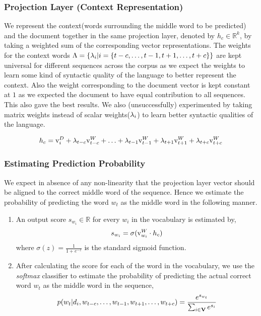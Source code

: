 \subsubsection{Projection Layer (Context Representation)}
We represent the context(words surrounding the middle word to be predicted) and the document together in the same projection layer, denoted by $h_{c} \in \mathbb{R}^{k}$, by taking a weighted sum of the corresponding vector representations. 
The weights for the context words $\Lambda = \{\lambda_{i} | i=\{t-c, \ldots, t-1, t+1, \ldots, t+c\}\}$ are kept universal for different sequences across the corpus as we expect the weights to learn some kind of syntactic quality of the language to better represent the context. Also the weight corresponding to the document vector is kept constant at $1$ as we expected the document to have equal contribution to all sequences. This also gave the best results.
We also (unsuccessfully) experimented by taking matrix weights instead of scalar weights($\lambda_{i}$) to learn better syntactic qualities of the language. 

\begin{equation}
\label{eq:hidden_vec}
h_{c} = \mathrm{v}^{D}_{i} + \lambda_{t-c}\mathrm{v}^{W}_{t-c} + \ldots + \lambda_{t-1}\mathrm{v}^{W}_{t-1} + \lambda_{t+1}\mathrm{v}^{W}_{t+1} + \lambda_{t+c}\mathrm{v}^{W}_{t+c}
\end{equation}

\subsubsection{Estimating Prediction Probability}
We expect in absence of any non-linearity that the projection layer vector should be aligned to the correct middle word of the sequence. Hence we estimate the probability of predicting the word $w_{t}$ as the middle word in the following manner. 
\begin{enumerate}
\item An output score $s_{w_{i}} \in \mathbb{R}$ for every $w_{i}$ in the vocabulary is estimated by,
\begin{equation}
\label{eq:nn_score}
s_{w_{i}} = \sigma(\mathrm{v}^{W}_{w_{i}}\cdot h_{c})
\end{equation}
where $\sigma(z) = \frac{1}{1+e^{-z}}$ is the standard sigmoid function. 
\item After calculating the score for each of the word in the vocabulary, we use the \emph{softmax} classifier to estimate the probability of predicting the actual correct word $w_{t}$ as the middle word in the sequence,
\begin{equation}
\label{eq:soft_prob}
p(w_{t} | d_{i}, w_{t-c}, \ldots, w_{t-1}, w_{t+1}, \ldots, w_{t+c}) = \frac{e^{s_{w_{t}}}}{\sum_{i \in \mathbf{V}} e^{s_{i}}}
\end{equation}
\end{enumerate}

